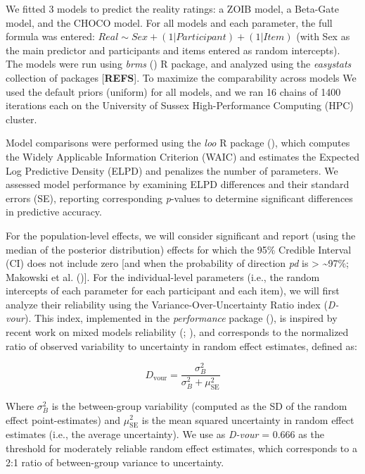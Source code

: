 \documentclass[
  jou,
  floatsintext,
  longtable,
  nolmodern,
  notxfonts,
  notimes,
  colorlinks=true,linkcolor=blue,citecolor=blue,urlcolor=blue]{apa7}
\begin{document}
We fitted 3 models to predict the reality ratings: a ZOIB model, a
Beta-Gate model, and the CHOCO model. For all models and each parameter,
the full formula was entered:
\(Real\sim Sex + (1 | Participant) + (1 | Item)\) (with Sex as the main
predictor and participants and items entered as random intercepts). The
models were run using \emph{brms}
() R package, and analyzed
using the \emph{easystats} collection of packages {[}\textbf{REFS}{]}.
To maximize the comparability across models We used the default priors
(uniform) for all models, and we ran 16 chains of 1400 iterations each
on the University of Sussex High-Performance Computing (HPC) cluster.

Model comparisons were performed using the \emph{loo} R package
(), which
computes the Widely Applicable Information Criterion (WAIC) and
estimates the Expected Log Predictive Density (ELPD) and penalizes the
number of parameters. We assessed model performance by examining ELPD
differences and their standard errors (SE), reporting corresponding
\emph{p}-values to determine significant differences in predictive
accuracy.

For the population-level effects, we will consider significant and
report (using the median of the posterior distribution) effects for
which the 95\% Credible Interval (CI) does not include zero {[}and when
the probability of direction \emph{pd} is \textgreater{}
\textasciitilde97\%; Makowski et al.
(){]}. For the individual-level
parameters (i.e., the random intercepts of each parameter for each
participant and each item), we will first analyze their reliability
using the Variance-Over-Uncertainty Ratio index (\emph{D-vour}). This
index, implemented in the \emph{performance} package
(), is
inspired by recent work on mixed models reliability
(;
), and
corresponds to the normalized ratio of observed variability to
uncertainty in random effect estimates, defined as:

\[
D_{\text{vour}} = \frac{\sigma_B^2}{\sigma_B^2 + \mu_{\text{SE}}^2}
\]

Where \(\sigma_B^2\) is the between-group variability (computed as the
SD of the random effect point-estimates) and \(\mu_{\text{SE}}^2\) is
the mean squared uncertainty in random effect estimates (i.e., the
average uncertainty). We use as \emph{D-vour} = 0.666 as the threshold
for moderately reliable random effect estimates, which corresponds to a
2:1 ratio of between-group variance to uncertainty.
\end{document}
